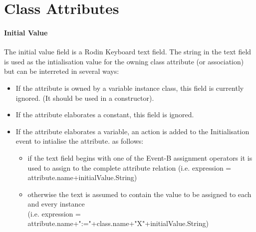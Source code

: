 \section{Class Attributes}
\label{sec:classdiagrams-attributes}



\paragraph{Initial Value } 
The initial value field is a Rodin Keyboard text field. 
The string in the text field is used as the intialisation value for the owning class attribute (or association) but can be interreted in several ways:
\begin{itemize}
	\item If the attribute is owned by a variable instance class, this field is currently ignored. (It should be used in a constructor).
	\item If the attribute elaborates a constant, this field is ignored. 
	\item If the attribute elaborates a variable, an action is added to the Initialisation event to intialise the attribute. as follows:
	\begin{itemize}
		\item if the text field begins with one of the Event-B assignment operators it is used to assign to the complete attribute relation (i.e. expression = attribute.name+initialValue.String)
		\item otherwise the text is assumed to contain the value to be assigned to each and every instance \\(i.e. expression = attribute.name+":="+class.name+"X"+initialValue.String)
	\end{itemize}	
\end{itemize}


